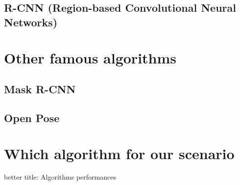 \subsection{R-CNN (Region-based Convolutional Neural Networks)} \label{sec:r-cnn}
\cite{r-cnn}\cite{fast-r-cnn}\cite{faster-r-cnn}\cite{mask-r-cnn}



















\section{Other famous algorithms}
\subsection{Mask R-CNN} 
\cite{mask-r-cnn}

\subsection{Open Pose} 
\cite{openpose-PAF}\cite{openpose-STAF}

\section{Which algorithm for our scenario}
better title: Algorithms performances
